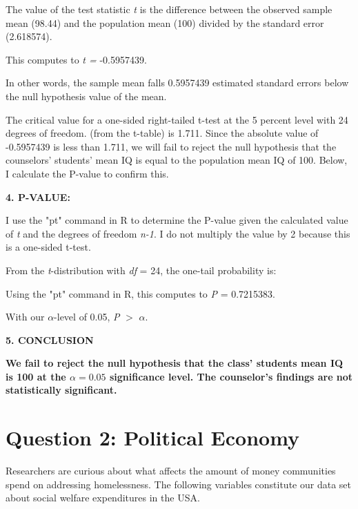 \documentclass[12pt,letterpaper]{article}
\begin{document}
\begin{enumerate}
		The value of the test statistic \textit{t} is the difference between the observed sample mean (98.44) and the population mean (100) divided by the standard error (2.618574).
		
		
		
		This computes to \textit{t = }-0.5957439.
		
		In other words, the sample mean falls 0.5957439 estimated standard errors below the null hypothesis value of the mean. 
		
		The critical value for a one-sided right-tailed t-test at the 5 percent level with 24 degrees of freedom. (from the t-table) is 1.711. Since the absolute value of -0.5957439 is less than 1.711, we will fail to reject the null hypothesis that the counselors' students' mean IQ is equal to the population mean IQ of 100. Below, I  calculate the P-value to confirm this. 
		
		\textbf{4. P-VALUE:}
		
		I use the "pt" command in R to determine the P-value given the calculated value of \textit{t} and the degrees of freedom \textit{n-1}. I do not multiply the value by 2 because this is a one-sided t-test. 
		
		From the \textit{t}-distribution with \textit{df} = 24, the one-tail probability is:
		
		
		
		Using the "pt" command in R, this computes to \textit{P} = 0.7215383.
		
		With our $\alpha$-level of 0.05, \textit{P} $>$ $\alpha$. 
		
		\textbf{5. CONCLUSION}
		
		\textbf{We fail to reject the null hypothesis that the class' students mean IQ is 100 at the $\alpha=0.05$ significance level. The counselor's findings are not statistically significant. }
	\end{enumerate}
	
	\newpage
	
	\section*{Question 2: Political Economy}
	
	\noindent Researchers are curious about what affects the amount of money communities spend on addressing homelessness. The following variables constitute our data set about social welfare expenditures in the USA. \\
	\vspace{.5cm}
	
\end{document}
